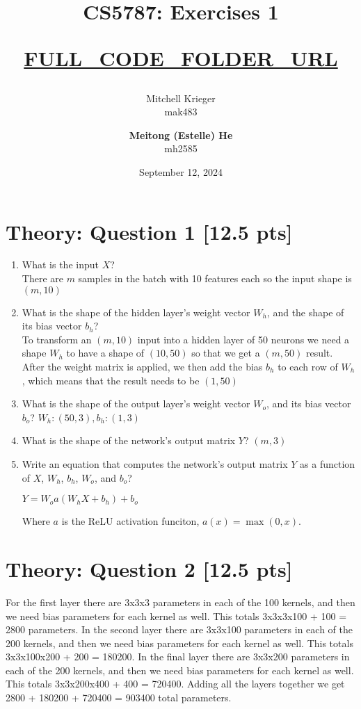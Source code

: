 \documentclass{article}
\title{CS5787: Exercises 1 \\ \begin{small}\url{FULL_CODE_FOLDER_URL}\end{small}}
\author{Mitchell Krieger \\ mak483 \and \textbf{Meitong (Estelle) He} \\ mh2585}
\date{September 12, 2024}
\begin{document}
\maketitle

\section{Theory: Question 1 [12.5 pts]}

\begin{enumerate}[label=\alph*.]
    \item What is the input $X$? \\ There are $m$ samples in the batch with 10 features each so the input shape is $(m, 10)$ 
    \item What is the shape of the hidden layer's weight vector $W_h$, and the shape of its bias vector $b_h$? \\ To transform an $(m, 10)$ input into a hidden layer of 50 neurons we need a shape $W_h$ to have a shape of $(10, 50)$ so that we get a $(m, 50)$ result. After the weight matrix is applied, we then add the bias $b_h$ to each row of $W_h$, which means that the result needs to be $(1, 50)$
    \item What is the shape of the output layer's weight vector $W_o$, and its bias vector $b_o$? $W_h: (50, 3), b_h: (1, 3)$
    \item What is the shape of the network's output matrix $Y$? $(m, 3)$
    \item Write an equation that computes the network's output matrix $Y$ as a function of $X$, $W_h$, $b_h$, $W_o$, and $b_o$?
    
          $Y = W_oa(W_hX+b_h)+b_o$ 

          Where $a$ is the ReLU activation funciton, $a(x) = \max(0,x)$.
\end{enumerate}

\section{Theory: Question 2 [12.5 pts]}

For the first layer there are 3x3x3 parameters in each of the 100 kernels, and then we need bias parameters for each kernel as well. This totals 3x3x3x100 + 100 = 2800 parameters.
In the second layer there are 3x3x100 parameters in each of the 200 kernels, and then we need bias parameters for each kernel as well. This totals 3x3x100x200 + 200 = 180200.
In the final layer there are 3x3x200 parameters in each of the 200 kernels, and then we need bias parameters for each kernel as well. This totals 3x3x200x400 + 400 = 720400.
Adding all the layers together we get 2800 + 180200 + 720400 = 903400 total parameters.
\end{document}
